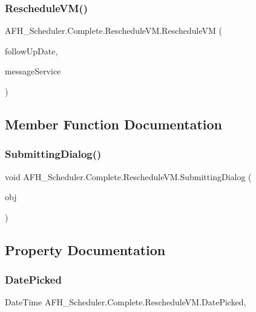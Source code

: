 \subsubsection{RescheduleVM()}
{\footnotesize\ttfamily A\+F\+H\+\_\+\+Scheduler.\+Complete.\+Reschedule\+V\+M.\+Reschedule\+VM (\begin{DoxyParamCaption}\item[{string}]{follow\+Up\+Date,  }\item[{\textbf{ Open\+Message\+Dialog\+Service}}]{message\+Service }\end{DoxyParamCaption})}



\subsection{Member Function Documentation}
\mbox{\label{class_a_f_h___scheduler_1_1_complete_1_1_reschedule_v_m_a8e5509483bc14a2ceec5063b6fceff9a}} 
\subsubsection{SubmittingDialog()}
{\footnotesize\ttfamily void A\+F\+H\+\_\+\+Scheduler.\+Complete.\+Reschedule\+V\+M.\+Submitting\+Dialog (\begin{DoxyParamCaption}\item[{object}]{obj }\end{DoxyParamCaption})}



\subsection{Property Documentation}
\mbox{\label{class_a_f_h___scheduler_1_1_complete_1_1_reschedule_v_m_ade5f6d063f2d61b3d2b8c554c7dcf6cd}} 
\subsubsection{DatePicked}
{\footnotesize\ttfamily Date\+Time A\+F\+H\+\_\+\+Scheduler.\+Complete.\+Reschedule\+V\+M.\+Date\+Picked\hspace{0.3cm}{\ttfamily [get]}, {\ttfamily [set]}}

